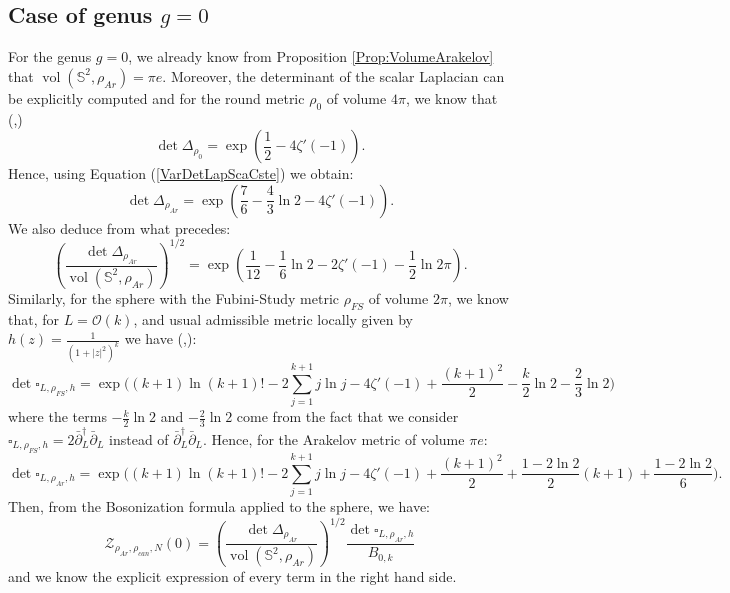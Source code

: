 \documentclass{article}
\theoremstyle{definition}
\theoremstyle{remark}
\DeclareMathOperator{\vol}{vol}
\begin{document}
\subsection{Case of genus $g=0$}
For the genus $g=0$, we already know from Proposition \ref{Prop:VolumeArakelov} that $\vol(\mathbb{S}^{2},\rho_{Ar})=\pi e.$ Moreover, the determinant of the scalar Laplacian can be explicitly computed and for the round metric $\rho_{0}$ of volume $4\pi$, we know that (\cite[eq. (4.77)]{ExplicitSphere},\cite[Th. 4.1]{ChoiDetLapS3-1994}) $$\det\Delta_{\rho_{0}}=\exp\left(\frac{1}{2}-4\zeta'(-1) \right).$$ Hence, using Equation (\ref{VarDetLapScaCste}) we obtain: 
\begin{equation}\label{DetLapScaArSph}\det\Delta_{\rho_{Ar}}=\exp\left(\frac{7}{6}-\frac{4}{3}\ln2 -4\zeta'(-1)\right).
\end{equation}
We also deduce from what precedes: \begin{equation*}
    \left(\frac{\det\Delta_{\rho_{Ar}}}{\vol(\mathbb{S}^{2},\rho_{Ar})} \right)^{1/2}=\exp\left(\frac{1}{12}-\frac{1}{6}\ln2-2\zeta'(-1)-\frac{1}{2}\ln2\pi \right).
\end{equation*}
Similarly, for the sphere with the Fubini-Study metric $\rho_{FS}$ of volume $2\pi$, we know that, for $L=\mathcal{O}(k)$, and usual admissible metric locally given by $h(z)=\frac{1}{(1+|z|^{2})^{k}}$ we have (\cite[eq. (74)]{KlevtsovQuillen},\cite[p. 352]{WengDeterminantLaplacian}): 
$$\det\square_{L,\rho_{FS},h}=\exp\bigg((k+1)\ln(k+1)!-2\sum_{j=1}^{k+1}j\ln j-4\zeta'(-1)+\frac{(k+1)^{2}}{2}-\frac{k}{2}\ln2-\frac{2}{3}\ln2\bigg)$$ where the terms $-\frac{k}{2}\ln2$ and $-\frac{2}{3}\ln2$ come from the fact that we consider $\square_{L,\rho_{FS},h}=2\bar{\partial}^{\dagger}_{L}\bar{\partial}_{L}$ instead of $\bar{\partial}^{\dagger}_{L}\bar{\partial}_{L}$.  Hence, for the Arakelov metric of volume $\pi e$: \begin{equation}\label{DetLapMagArSph}
    \det \square_{L,\rho_{Ar},h}=\exp\bigg((k+1)\ln(k+1)!-2\sum_{j=1}^{k+1}j\ln j-4\zeta'(-1)+\frac{(k+1)^{2}}{2}+\frac{1-2\ln2}{2}(k+1)+\frac{1-2\ln2}{6}\bigg).
\end{equation}
Then, from the Bosonization formula applied to the sphere, we have: \begin{equation}
    \mathcal{Z}_{\rho_{Ar},\rho_{can},N}(0)=\left(\frac{\det \Delta_{\rho_{Ar}}}{\vol(\mathbb{S}^{2},\rho_{Ar})}\right)^{1/2}\frac{\det\square_{L,\rho_{Ar},h}}{B_{0,k}}
\end{equation}
and we know the explicit expression of every term in the right hand side.
\end{document}
